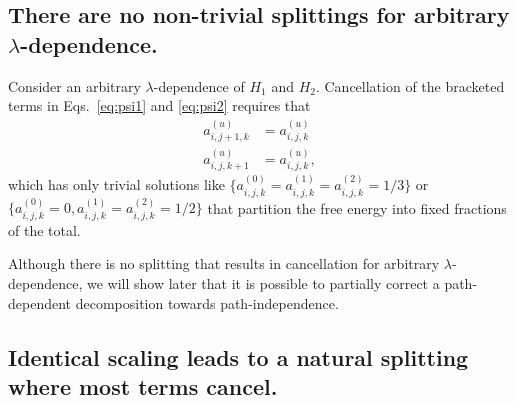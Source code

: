 \documentclass{article}
\begin{document}
\subsection{There are no non-trivial splittings for arbitrary $\lambda$-dependence.}

Consider an arbitrary $\lambda$-dependence of $H_1$ and $H_2$. Cancellation of the bracketed terms in Eqs.~\ref{eq:psi1} and \ref{eq:psi2} requires that
\begin{align*}
a_{i,j+1,k}^{(u)} &= a_{i,j,k}^{(u)} \\
a_{i,j,k+1}^{(u)} &= a_{i,j,k}^{(u)},
\end{align*}
which has only trivial solutions like $\big\{a_{i,j,k}^{(0)} = a_{i,j,k}^{(1)} = a_{i,j,k}^{(2)} = 1/3\big\}$ or $\big\{a_{i,j,k}^{(0)}=0, a_{i,j,k}^{(1)}=a_{i,j,k}^{(2)}=1/2 \big\}$ that partition the free energy into fixed fractions of the total.

Although there is no splitting that results in cancellation for arbitrary $\lambda$-dependence, we will show later that it is possible to partially correct a path-dependent decomposition towards path-independence.

\subsection{Identical scaling leads to a natural splitting where most terms cancel.}
\end{document}
